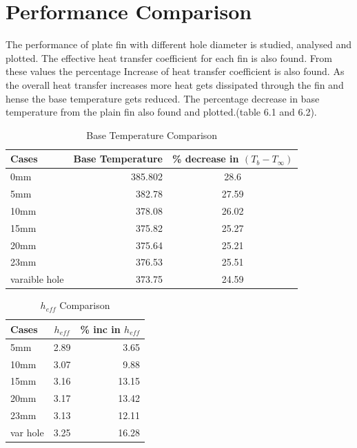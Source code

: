 \section{Performance Comparison}
The performance of plate fin with different hole diameter is studied, analysed and plotted. The effective heat transfer coefficient for each fin is also found. From these values the percentage Increase of heat transfer coefficient is also found. As the overall heat transfer increases more heat gets dissipated through the fin and hense the base temperature gets reduced. The percentage decrease in base temperature from the plain fin also found and plotted.(table 6.1 and 6.2).

 \begin{table}[h]
 	\centering
 	\begin{tabular}{|l|r|c|}  %
 		\hline
 		Cases & Base Temperature & \% decrease in $(T_b - T_\infty)$ \\
 		\hline
 		0mm & 385.802 & 28.6 \\
 		5mm & 382.78 & 27.59 \\
 		10mm & 378.08 & 26.02 \\
 		15mm & 375.82 & 25.27 \\
 		20mm & 375.64 & 25.21 \\
 		23mm & 376.53 & 25.51 \\
 		varaible hole & 373.75 & 24.59 \\
 		\hline
 	\end{tabular}
 	\caption{Base Temperature Comparison}
 \end{table}


 \begin{table}[h]
 	\centering
 	\begin{tabular}{|l|c|r|}  %
 		\hline
 		Cases & $h_{eff} $ & \% inc in $ h_{eff} $ \\
 		\hline
 		5mm & 2.89 & 3.65  \\
 		10mm & 3.07 & 9.88 \\
 		15mm & 3.16 & 13.15 \\
 		20mm & 3.17 & 13.42 \\
 		23mm & 3.13 & 12.11 \\
 		var hole & 3.25 & 16.28 \\
 		\hline
 	\end{tabular}
 	\caption{$h_{eff} $ Comparison}
 \end{table}

